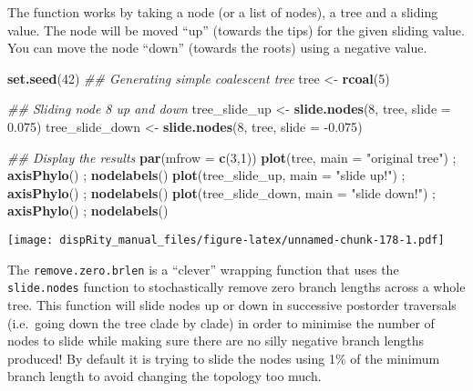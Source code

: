 \documentclass[
]{book}
\newenvironment{Shaded}{\begin{snugshade}}{\end{snugshade}}
\newcommand{\CommentTok}[1]{\textcolor[rgb]{0.56,0.35,0.01}{\textit{#1}}}
\newcommand{\DataTypeTok}[1]{\textcolor[rgb]{0.13,0.29,0.53}{#1}}
\newcommand{\DecValTok}[1]{\textcolor[rgb]{0.00,0.00,0.81}{#1}}
\newcommand{\FloatTok}[1]{\textcolor[rgb]{0.00,0.00,0.81}{#1}}
\newcommand{\KeywordTok}[1]{\textcolor[rgb]{0.13,0.29,0.53}{\textbf{#1}}}
\newcommand{\NormalTok}[1]{#1}
\newcommand{\StringTok}[1]{\textcolor[rgb]{0.31,0.60,0.02}{#1}}
\begin{document}
The function works by taking a node (or a list of nodes), a tree and a sliding value.
The node will be moved ``up'' (towards the tips) for the given sliding value.
You can move the node ``down'' (towards the roots) using a negative value.

\begin{Shaded}
\begin{Highlighting}[]
\KeywordTok{set.seed}\NormalTok{(}\DecValTok{42}\NormalTok{)}
\CommentTok{\#\# Generating simple coalescent tree}
\NormalTok{tree \textless{}{-}}\StringTok{ }\KeywordTok{rcoal}\NormalTok{(}\DecValTok{5}\NormalTok{)}

\CommentTok{\#\# Sliding node 8 up and down}
\NormalTok{tree\_slide\_up \textless{}{-}}\StringTok{ }\KeywordTok{slide.nodes}\NormalTok{(}\DecValTok{8}\NormalTok{, tree, }\DataTypeTok{slide =} \FloatTok{0.075}\NormalTok{)}
\NormalTok{tree\_slide\_down \textless{}{-}}\StringTok{ }\KeywordTok{slide.nodes}\NormalTok{(}\DecValTok{8}\NormalTok{, tree, }\DataTypeTok{slide =} \FloatTok{{-}0.075}\NormalTok{)}

\CommentTok{\#\# Display the results}
\KeywordTok{par}\NormalTok{(}\DataTypeTok{mfrow =} \KeywordTok{c}\NormalTok{(}\DecValTok{3}\NormalTok{,}\DecValTok{1}\NormalTok{))}
\KeywordTok{plot}\NormalTok{(tree, }\DataTypeTok{main =} \StringTok{"original tree"}\NormalTok{) ; }\KeywordTok{axisPhylo}\NormalTok{() ; }\KeywordTok{nodelabels}\NormalTok{()}
\KeywordTok{plot}\NormalTok{(tree\_slide\_up, }\DataTypeTok{main =} \StringTok{"slide up!"}\NormalTok{) ; }\KeywordTok{axisPhylo}\NormalTok{() ; }\KeywordTok{nodelabels}\NormalTok{()}
\KeywordTok{plot}\NormalTok{(tree\_slide\_down, }\DataTypeTok{main =} \StringTok{"slide down!"}\NormalTok{) ; }\KeywordTok{axisPhylo}\NormalTok{() ; }\KeywordTok{nodelabels}\NormalTok{()}
\end{Highlighting}
\end{Shaded}

\texttt{[image: dispRity\_manual\_files/figure-latex/unnamed-chunk-178-1.pdf]}

The \texttt{remove.zero.brlen} is a ``clever'' wrapping function that uses the \texttt{slide.nodes} function to stochastically remove zero branch lengths across a whole tree.
This function will slide nodes up or down in successive postorder traversals (i.e.~going down the tree clade by clade) in order to minimise the number of nodes to slide while making sure there are no silly negative branch lengths produced!
By default it is trying to slide the nodes using 1\% of the minimum branch length to avoid changing the topology too much.
\end{document}
